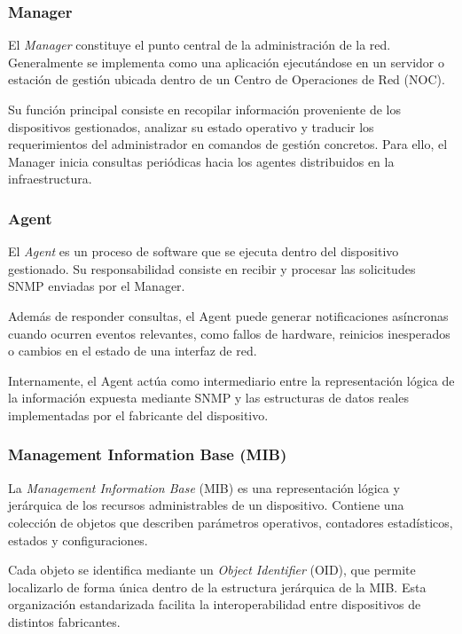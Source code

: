 \subsubsection{Manager}

El \textit{Manager} constituye el punto central de la administración de la red. Generalmente se implementa como una aplicación ejecutándose en un servidor o estación de gestión ubicada dentro de un Centro de Operaciones de Red (NOC).

Su función principal consiste en recopilar información proveniente de los dispositivos gestionados, analizar su estado operativo y traducir los requerimientos del administrador en comandos de gestión concretos. Para ello, el Manager inicia consultas periódicas hacia los agentes distribuidos en la infraestructura.

\subsubsection{Agent}

El \textit{Agent} es un proceso de software que se ejecuta dentro del dispositivo gestionado. Su responsabilidad consiste en recibir y procesar las solicitudes SNMP enviadas por el Manager.

Además de responder consultas, el Agent puede generar notificaciones asíncronas cuando ocurren eventos relevantes, como fallos de hardware, reinicios inesperados o cambios en el estado de una interfaz de red.

Internamente, el Agent actúa como intermediario entre la representación lógica de la información expuesta mediante SNMP y las estructuras de datos reales implementadas por el fabricante del dispositivo.

\subsubsection{Management Information Base (MIB)}

La \textit{Management Information Base} (MIB) es una representación lógica y jerárquica de los recursos administrables de un dispositivo. Contiene una colección de objetos que describen parámetros operativos, contadores estadísticos, estados y configuraciones.

Cada objeto se identifica mediante un \textit{Object Identifier} (OID), que permite localizarlo de forma única dentro de la estructura jerárquica de la MIB. Esta organización estandarizada facilita la interoperabilidad entre dispositivos de distintos fabricantes.

